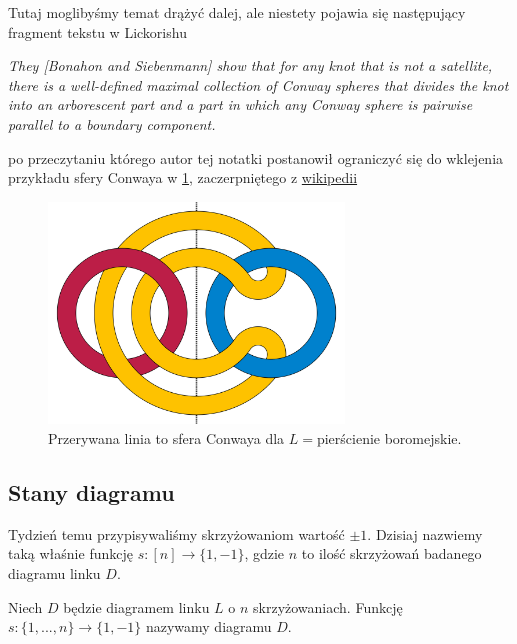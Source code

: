 \documentclass{article}
\begin{document}
Tutaj moglibyśmy temat drążyć dalej, ale niestety pojawia się następujący fragment tekstu w Lickorishu

\begin{adjustwidth}{5cm}{5cm}
\begin{center}
  \slshape 
  They \emph{[Bonahon and Siebenmann]} show that for any knot that is not a
satellite, there is a well-defined maximal collection of Conway spheres that divides
the knot into an arborescent part and a part in which any Conway sphere is pairwise
parallel to a boundary component.
\end{center}
\end{adjustwidth}

po przeczytaniu którego autor tej notatki postanowił ograniczyć się do wklejenia przykładu sfery Conwaya w \cref{conway sphere}, zaczerpniętego z \href{https://en.wikipedia.org/wiki/Conway_sphere#/media/File:Algebraic_Borromean_link_diagram.svg}{wikipedii}
\begin{figure}[h]\centering
  \includegraphics[width=0.7\textwidth]{conway-sphere.png}
  \caption{\label{conway sphere}Przerywana linia to sfera Conwaya dla $L=$pierścienie boromejskie.}
\end{figure}

\subsection{Stany diagramu}

Tydzień temu przypisywaliśmy skrzyżowaniom wartość $\pm1$. Dzisiaj nazwiemy taką właśnie funkcję $s:[n]\to \{1, -1\}$, gdzie $n$ to ilość skrzyżowań badanego diagramu linku $D$.

\begin{deff}
  Niech $D$ będzie diagramem linku $L$ o $n$ skrzyżowaniach. Funkcję $s:\{1,..., n\}\to \{1, -1\}$ nazywamy  diagramu $D$.
\end{deff}
\end{document}

